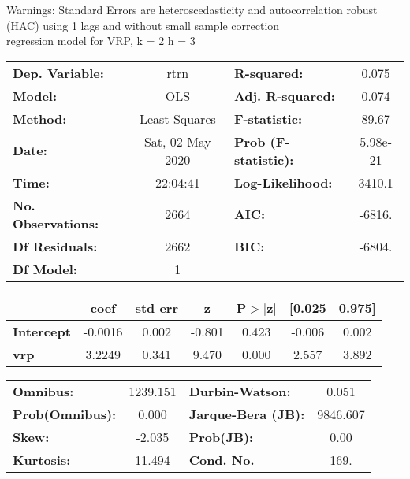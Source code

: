 Warnings: \newline
 [1] Standard Errors are heteroscedasticity and autocorrelation robust (HAC) using 1 lags and without small sample correction\\ 

regression model for VRP, k = 2 h = 3\begin{center}
\begin{tabular}{lclc}
\toprule
\textbf{Dep. Variable:}    &       rtrn       & \textbf{  R-squared:         } &     0.075   \\
\textbf{Model:}            &       OLS        & \textbf{  Adj. R-squared:    } &     0.074   \\
\textbf{Method:}           &  Least Squares   & \textbf{  F-statistic:       } &     89.67   \\
\textbf{Date:}             & Sat, 02 May 2020 & \textbf{  Prob (F-statistic):} &  5.98e-21   \\
\textbf{Time:}             &     22:04:41     & \textbf{  Log-Likelihood:    } &    3410.1   \\
\textbf{No. Observations:} &        2664      & \textbf{  AIC:               } &    -6816.   \\
\textbf{Df Residuals:}     &        2662      & \textbf{  BIC:               } &    -6804.   \\
\textbf{Df Model:}         &           1      & \textbf{                     } &             \\
\bottomrule
\end{tabular}
\begin{tabular}{lcccccc}
                   & \textbf{coef} & \textbf{std err} & \textbf{z} & \textbf{P$> |$z$|$} & \textbf{[0.025} & \textbf{0.975]}  \\
\midrule
\textbf{Intercept} &      -0.0016  &        0.002     &    -0.801  &         0.423        &       -0.006    &        0.002     \\
\textbf{vrp}       &       3.2249  &        0.341     &     9.470  &         0.000        &        2.557    &        3.892     \\
\bottomrule
\end{tabular}
\begin{tabular}{lclc}
\textbf{Omnibus:}       & 1239.151 & \textbf{  Durbin-Watson:     } &    0.051  \\
\textbf{Prob(Omnibus):} &   0.000  & \textbf{  Jarque-Bera (JB):  } & 9846.607  \\
\textbf{Skew:}          &  -2.035  & \textbf{  Prob(JB):          } &     0.00  \\
\textbf{Kurtosis:}      &  11.494  & \textbf{  Cond. No.          } &     169.  \\
\bottomrule
\end{tabular}
\end{center}

